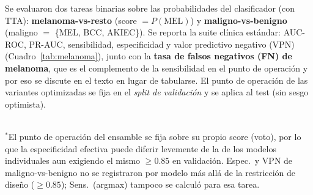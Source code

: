 \documentclass[11pt, a4paper]{article}
\begin{document}
Se evaluaron dos tareas binarias sobre las probabilidades del clasificador (con TTA): \textbf{melanoma-vs-resto}
(score $=P(\text{MEL})$) y \textbf{maligno-vs-benigno} (maligno $=$ \{MEL, BCC, AKIEC\}). Se reporta la suite
clínica estándar: AUC-ROC, PR-AUC, sensibilidad, especificidad y valor predictivo negativo (VPN)
(Cuadro~\ref{tab:melanoma}), junto con la \textbf{tasa de falsos negativos (FN) de melanoma}, que es el
complemento de la sensibilidad en el punto de operación y por eso se discute en el texto en lugar de
tabularse. El punto de operación de las
variantes optimizadas se fija en el \emph{split de validación} y se aplica al test (sin sesgo optimista).

\begin{table}[H]
  \centering
  \caption{Detección de melanoma sobre HAM10000 test ($n=1503$), en dos tareas binarias (las filas en
  cursiva son encabezados de bloque, no datos). AUC-ROC y PR-AUC son independientes del umbral;
  ``esp$\ge$85'' fija el punto de operación en validación exigiendo especificidad $\ge0.85$ (prioriza no
  perder melanomas); Espec.\ y VPN son los valores efectivamente alcanzados en test bajo ese punto de
  operación. La tasa de falsos negativos es el complemento de Sens.\ (esp$\ge$85), por lo que no se tabula
  aparte. ``---'' = no disponible.}
  \label{tab:melanoma}
  \small
  \\[2pt]
  {\footnotesize $^{\ast}$El punto de operación del ensamble se fija sobre su propio score (voto), por lo
  que la especificidad efectiva puede diferir levemente de la de los modelos individuales aun exigiendo el
  mismo $\ge0.85$ en validación. Espec.\ y VPN de maligno-vs-benigno no se registraron por modelo más allá
  de la restricción de diseño ($\ge0.85$); Sens.\ (argmax) tampoco se calculó para esa tarea.}
\end{table}
\end{document}

